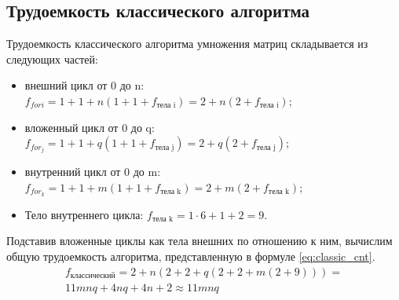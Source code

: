 \documentclass[12pt]{report}
\begin{document}
    \subsection{Трудоемкость классического алгоритма}
    Трудоемкость классического алгоритма умножения матриц складывается из следующих частей:
    \begin{itemize}
        \item внешний цикл от 0 до n: $f_{for i}=1 + 1 + n(1 + 1 + f_{\text{тела i}}) = 2 + n(2 + f_{\text{тела i}})$;
        \item вложенный цикл от 0 до q: $f_{for_j}=1 + 1 +q(1 + 1 + f_{\text{тела j}}) = 2 + q(2 + f_{\text{тела j}})$;
        \item внутренний цикл от 0 до m: $f_{for_k}=1 + 1 + m(1 + 1 + f_{\text{тела k}}) = 2 + m(2 + f_{\text{тела k}})$;
        \item Тело внутреннего цикла: $f_{\text{тела k}} = 1 \cdot 6 + 1 + 2 = 9$.
    \end{itemize}

    Подставив вложенные циклы как тела внешних по отношению к ним,
    вычислим общую трудоемкость алгоритма, представленную в формуле \ref{eq:classic_cnt}.
    \begin{equation}
        \label{eq:classic_cnt}
        \begin{array}{ll}
            f_{\text{классический}} = 2 + n(2 + 2 + q(2 + 2 + m(2 + 9))) = \\
            11mnq + 4nq + 4n + 2 \approx 11mnq
        \end{array}
    \end{equation}
\end{document}
